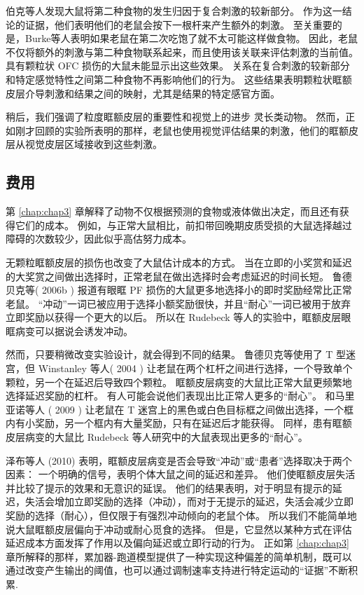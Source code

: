 伯克等人发现大鼠将第二种食物的发生归因于复合刺激的较新部分。
作为这一结论的证据，他们表明他们的老鼠会按下一根杆来产生额外的刺激。
至关重要的是，Burke等人表明如果老鼠在第二次吃饱了就不太可能这样做食物。
因此，老鼠不仅将额外的刺激与第二种食物联系起来，而且使用该关联来评估刺激的当前值。
具有颗粒状 OFC 损伤的大鼠未能显示出这些效果。
关系在复合刺激的较新部分和特定感觉特性之间第二种食物不再影响他们的行为。
这些结果表明颗粒状眶额皮层介导刺激和结果之间的映射，尤其是结果的特定感官方面。\par


稍后，我们强调了粒度眶额皮层的重要性和视觉上的进步
灵长类动物。
然而，正如刚才回顾的实验所表明的那样，老鼠也使用视觉评估结果的刺激，他们的眶额皮层从视觉皮层区域接收到这些刺激。\par



\subsection{费用}

第 \ref{chap:chap3} 章解释了动物不仅根据预测的食物或液体做出决定，而且还有获得它们的成本。
例如，与正常大鼠相比，前扣带回晚期皮质受损的大鼠选择越过障碍的次数较少，因此似乎高估努力成本。\par


无颗粒眶额皮层的损伤也改变了大鼠估计成本的方式。
当在立即的小奖赏和延迟的大奖赏之间做出选择时，正常老鼠在做出选择时会考虑延迟的时间长短。
鲁德贝克等( 2006b ) 报道有眼眶 PF 损伤的大鼠更多地选择小的即时奖励经常比正常老鼠。
“冲动”一词已被应用于选择小额奖励很快，并且“耐心”一词已被用于放弃立即奖励以获得一个更大的以后。
所以在 Rudebeck 等人的实验中，眶额皮层眼眶病变可以据说会诱发冲动。\par


然而，只要稍微改变实验设计，就会得到不同的结果。
鲁德贝克等使用了 T 型迷宫，但 Winstanley 等人( 2004 ) 让老鼠在两个杠杆之间进行选择，一个导致单个颗粒，另一个在延迟后导致四个颗粒。 
眶额皮层病变的大鼠比正常大鼠更频繁地选择延迟奖励的杠杆。
有人可能会说他们表现出比正常人更多的“耐心”。
和马里亚诺等人 ( 2009 ) 让老鼠在 T 迷宫上的黑色或白色目标框之间做出选择，一个框内有小奖励，另一个框内有大量奖励，只有在延迟后才能获得。
同样，患有眶额皮层病变的大鼠比 Rudebeck 等人研究中的大鼠表现出更多的“耐心”。\par


泽布等人 (2010) 表明，眶额皮层病变是否会导致“冲动”或“患者”选择取决于两个因素：
一个明确的信号，表明个体大鼠之间的延迟和差异。
他们使眶额皮层失活并比较了提示的效果和无意识的延误。
他们的结果表明，对于明显有提示的延迟，失活会增加立即奖励的选择（冲动），而对于无提示的延迟，失活会减少立即奖励的选择（耐心），但仅限于有强烈冲动倾向的老鼠个体。
所以我们不能简单地说大鼠眶额皮层偏向于冲动或耐心觅食的选择。
但是，它显然以某种方式在评估延迟成本方面发挥了作用以及偏向延迟或立即行动的行为。
正如第 \ref{chap:chap3} 章所解释的那样，累加器-跑道模型提供了一种实现这种偏差的简单机制，既可以通过改变产生输出的阈值，也可以通过调制速率支持进行特定运动的“证据”不断积累. \par


